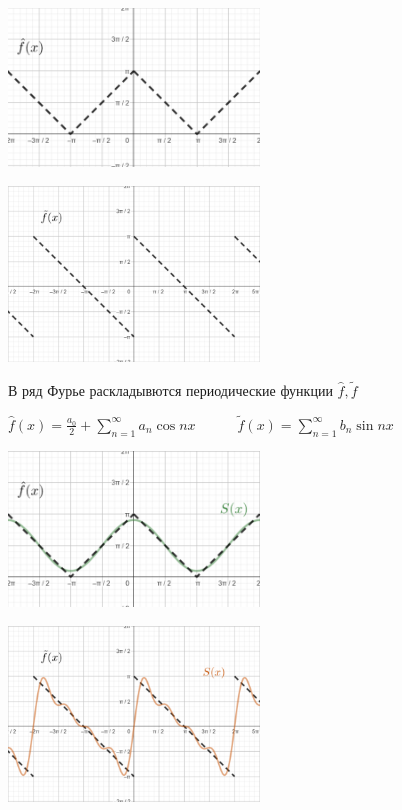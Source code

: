 \documentclass[12pt]{article}
\begin{document}
    \begin{multicols}{2}
        \includegraphics[width=0.5\textwidth]{addchapters1/images/addchapters1_2024_11_15_4}

        \includegraphics[width=0.5\textwidth]{addchapters1/images/addchapters1_2024_11_15_3}
    \end{multicols}

    В ряд Фурье раскладывются периодические функции $\hat{f}, \tilde{f}$

    \Lab $\hat{f}(x) = \frac{a_0}{2} + \sum_{n = 1}^\infty a_n \cos nx \quad\quad\quad \tilde{f}(x) = \sum_{n = 1}^\infty b_n \sin nx$

    \mediumvspace

    \begin{multicols}{2}
        \includegraphics[width=0.5\textwidth]{addchapters1/images/addchapters1_2024_11_15_5}

        \includegraphics[width=0.5\textwidth]{addchapters1/images/addchapters1_2024_11_15_6}
    \end{multicols}
\end{document}
